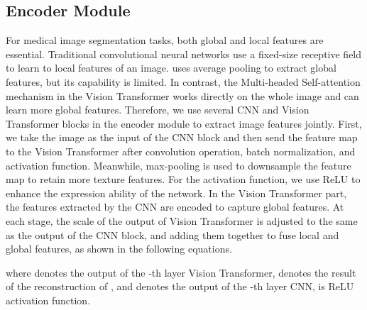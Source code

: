 \documentclass{article}
\begin{document}
\vspace{-4mm}
\subsection{Encoder Module}
\vspace{-1mm}
For medical image segmentation tasks, both global and local features are essential. Traditional convolutional neural networks use a fixed-size receptive field to learn to local features of an image. \cite{huang2021gloria} uses average pooling to extract global features, but its capability is limited. In contrast, the Multi-headed Self-attention mechanism in the Vision Transformer works directly on the whole image and can learn more global features. Therefore, we use several CNN and Vision Transformer blocks in the encoder module to extract image features jointly. First, we take the image as the input of the CNN block and then send the feature map to the Vision Transformer after convolution operation, batch normalization, and activation function. Meanwhile, max-pooling is used to downsample the feature map to retain more texture features.
For the activation function, we use ReLU to enhance the expression ability of the network. In the Vision Transformer part,  the features extracted by the CNN are encoded to capture global features. At each stage, the scale of the output of Vision Transformer is adjusted to the same as the output of the CNN block, and adding them together to fuse local and global features, as shown in the following equations.
\vspace{-2mm}

where  denotes the output of the -th layer Vision Transformer,  denotes the result of the reconstruction of , and  denotes the output of the -th layer CNN,  is ReLU activation function.
 
\end{document}
